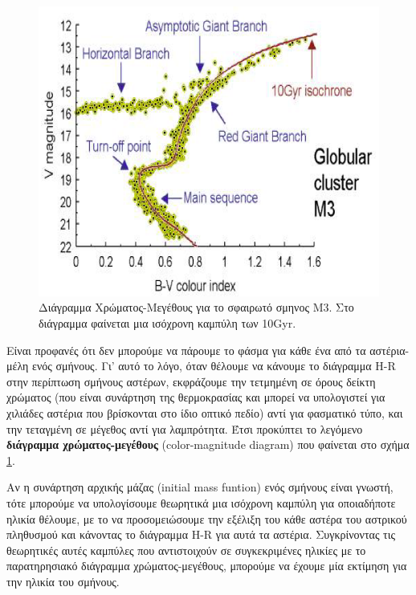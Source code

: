 \begin{figure}[h]
    \centering
    \includegraphics[scale=0.4]{Figures/cmd.png}
    \caption{Διάγραμμα Χρώματος-Μεγέθους για το σφαιρωτό σμηνος Μ3. Στο διάγραμμα φαίνεται μια ισόχρονη καμπύλη των 10Gyr.}
    \label{fig:CMD}
\end{figure}

Είναι προφανές ότι δεν μπορούμε να πάρουμε το φάσμα για κάθε ένα από τα αστέρια-μέλη ενός σμήνους. Γι' αυτό το λόγο, όταν θέλουμε να κάνουμε το διάγραμμα H-R στην περίπτωση σμήνους αστέρων, εκφράζουμε την τετμημένη σε όρους δείκτη χρώματος (που είναι συνάρτηση της θερμοκρασίας και μπορεί να υπολογιστεί για χιλιάδες αστέρια που βρίσκονται στο ίδιο οπτικό πεδίο) αντί για φασματικό τύπο, και την τεταγμένη σε μέγεθος αντί για λαμπρότητα. Έτσι προκύπτει το λεγόμενο \textbf{διάγραμμα χρώματος-μεγέθους} (color-magnitude diagram) που φαίνεται στο σχήμα \ref{fig:CMD}.

Αν η συνάρτηση αρχικής μάζας (initial mass funtion) ενός σμήνους είναι γνωστή, τότε μπορούμε να υπολογίσουμε θεωρητικά μια ισόχρονη καμπύλη για οποιαδήποτε ηλικία θέλουμε, με το να προσομειώσουμε την εξέλιξη του κάθε αστέρα του αστρικού πληθυσμού και κάνοντας το διάγραμμα H-R για αυτά τα αστέρια. Συγκρίνοντας τις θεωρητικές αυτές καμπύλες που αντιστοιχούν σε συγκεκριμένες ηλικίες με το παρατηρησιακό διάγραμμα χρώματος-μεγέθους, μπορούμε να έχουμε μία εκτίμηση για την ηλικία του σμήνους.






